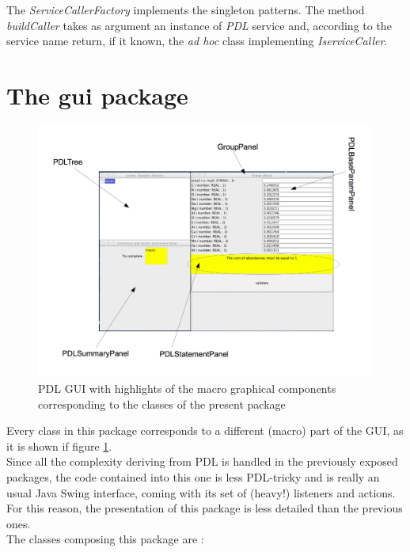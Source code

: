 \documentclass[a4paper,11pt] {ivoa}
\begin{document}
\noindent The {\it ServiceCallerFactory} implements the singleton patterns. The method {\it buildCaller} takes as argument an instance of {\it PDL} service and, according to the service name return, if it known, the {\it ad hoc} class implementing {\it IserviceCaller}.

\section{The gui package}
\begin{figure}[htbp]
\begin{center}
\hspace{-1cm}\includegraphics[width=1.2\textwidth]{pictures/PDLGui.jpg} 
\caption{PDL GUI with highlights of the macro graphical components corresponding to the classes of the present package}
\label{PDLGui.jpg}
\end{center}
\end{figure}
\noindent Every class in this package corresponds to a different (macro) part of the GUI, as it is shown if figure \ref{PDLGui.jpg}. \\
\noindent Since all the complexity deriving from PDL is handled in the previously exposed packages, the code contained into this one is less PDL-tricky and is really an usual Java Swing interface, coming with its set of (heavy!) listeners and actions. For this reason, the presentation of this package is less detailed than the previous ones.\\
The classes composing this package are :
\end{document}
